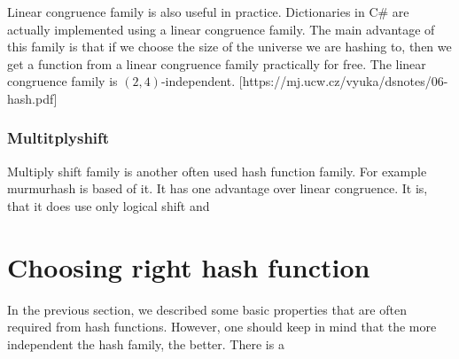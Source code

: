 Linear congruence family is also useful in practice. Dictionaries in C\# are actually implemented using a linear congruence family. The main advantage of this family is that if we choose the size of the universe we are hashing to, then we get a function from a linear congruence family practically for free. The linear congruence family is $(2,4)$-independent. 
[https://mj.ucw.cz/vyuka/dsnotes/06-hash.pdf]

\subsubsection{Multitplyshift}
Multiply shift family is another often used hash function family. For example murmurhash is based of it. It has one advantage over linear congruence. It is, that it does use only logical shift and 


\section{Choosing right hash function}
In the previous section, we described some basic properties that are often required from hash functions. However, one should keep in mind that the more independent the hash family, the better. There is a 